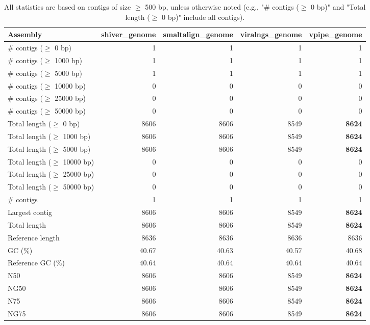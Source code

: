 \documentclass[12pt,a4paper]{article}
\begin{document}
\begin{table}[ht]
\begin{center}
\caption{All statistics are based on contigs of size $\geq$ 500 bp, unless otherwise noted (e.g., "\# contigs ($\geq$ 0 bp)" and "Total length ($\geq$ 0 bp)" include all contigs).}
\begin{tabular}{|l*{4}{|r}|}
\hline
Assembly & shiver\_genome & smaltalign\_genome & viralngs\_genome & vpipe\_genome \\ \hline
\# contigs ($\geq$ 0 bp) & 1 & 1 & 1 & 1 \\ \hline
\# contigs ($\geq$ 1000 bp) & 1 & 1 & 1 & 1 \\ \hline
\# contigs ($\geq$ 5000 bp) & 1 & 1 & 1 & 1 \\ \hline
\# contigs ($\geq$ 10000 bp) & 0 & 0 & 0 & 0 \\ \hline
\# contigs ($\geq$ 25000 bp) & 0 & 0 & 0 & 0 \\ \hline
\# contigs ($\geq$ 50000 bp) & 0 & 0 & 0 & 0 \\ \hline
Total length ($\geq$ 0 bp) & 8606 & 8606 & 8549 & {\bf 8624} \\ \hline
Total length ($\geq$ 1000 bp) & 8606 & 8606 & 8549 & {\bf 8624} \\ \hline
Total length ($\geq$ 5000 bp) & 8606 & 8606 & 8549 & {\bf 8624} \\ \hline
Total length ($\geq$ 10000 bp) & 0 & 0 & 0 & 0 \\ \hline
Total length ($\geq$ 25000 bp) & 0 & 0 & 0 & 0 \\ \hline
Total length ($\geq$ 50000 bp) & 0 & 0 & 0 & 0 \\ \hline
\# contigs & 1 & 1 & 1 & 1 \\ \hline
Largest contig & 8606 & 8606 & 8549 & {\bf 8624} \\ \hline
Total length & 8606 & 8606 & 8549 & {\bf 8624} \\ \hline
Reference length & 8636 & 8636 & 8636 & 8636 \\ \hline
GC (\%) & 40.67 & 40.63 & 40.57 & 40.68 \\ \hline
Reference GC (\%) & 40.64 & 40.64 & 40.64 & 40.64 \\ \hline
N50 & 8606 & 8606 & 8549 & {\bf 8624} \\ \hline
NG50 & 8606 & 8606 & 8549 & {\bf 8624} \\ \hline
N75 & 8606 & 8606 & 8549 & {\bf 8624} \\ \hline
NG75 & 8606 & 8606 & 8549 & {\bf 8624} \\ \hline

\end{tabular}
\end{center}
\end{table}
\end{document}
